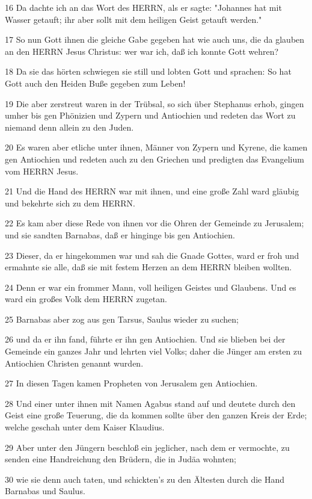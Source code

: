 \par 16 Da dachte ich an das Wort des HERRN, als er sagte: "Johannes hat mit Wasser getauft; ihr aber sollt mit dem heiligen Geist getauft werden."
\par 17 So nun Gott ihnen die gleiche Gabe gegeben hat wie auch uns, die da glauben an den HERRN Jesus Christus: wer war ich, daß ich konnte Gott wehren?
\par 18 Da sie das hörten schwiegen sie still und lobten Gott und sprachen: So hat Gott auch den Heiden Buße gegeben zum Leben!
\par 19 Die aber zerstreut waren in der Trübsal, so sich über Stephanus erhob, gingen umher bis gen Phönizien und Zypern und Antiochien und redeten das Wort zu niemand denn allein zu den Juden.
\par 20 Es waren aber etliche unter ihnen, Männer von Zypern und Kyrene, die kamen gen Antiochien und redeten auch zu den Griechen und predigten das Evangelium vom HERRN Jesus.
\par 21 Und die Hand des HERRN war mit ihnen, und eine große Zahl ward gläubig und bekehrte sich zu dem HERRN.
\par 22 Es kam aber diese Rede von ihnen vor die Ohren der Gemeinde zu Jerusalem; und sie sandten Barnabas, daß er hinginge bis gen Antiochien.
\par 23 Dieser, da er hingekommen war und sah die Gnade Gottes, ward er froh und ermahnte sie alle, daß sie mit festem Herzen an dem HERRN bleiben wollten.
\par 24 Denn er war ein frommer Mann, voll heiligen Geistes und Glaubens. Und es ward ein großes Volk dem HERRN zugetan.
\par 25 Barnabas aber zog aus gen Tarsus, Saulus wieder zu suchen;
\par 26 und da er ihn fand, führte er ihn gen Antiochien. Und sie blieben bei der Gemeinde ein ganzes Jahr und lehrten viel Volks; daher die Jünger am ersten zu Antiochien Christen genannt wurden.
\par 27 In diesen Tagen kamen Propheten von Jerusalem gen Antiochien.
\par 28 Und einer unter ihnen mit Namen Agabus stand auf und deutete durch den Geist eine große Teuerung, die da kommen sollte über den ganzen Kreis der Erde; welche geschah unter dem Kaiser Klaudius.
\par 29 Aber unter den Jüngern beschloß ein jeglicher, nach dem er vermochte, zu senden eine Handreichung den Brüdern, die in Judäa wohnten;
\par 30 wie sie denn auch taten, und schickten's zu den Ältesten durch die Hand Barnabas und Saulus.

